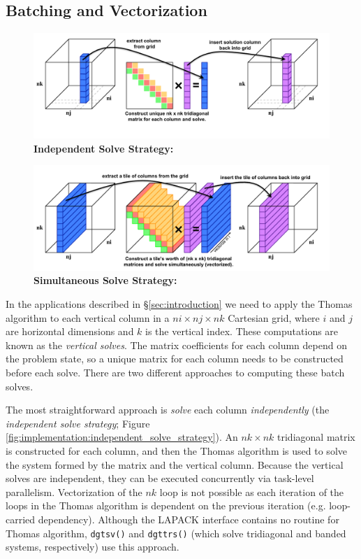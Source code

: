 \documentclass{sig-alternate-05-2015}
\begin{document}
\subsection{Batching and Vectorization}
\label{sec:implementation:batching_and_parallelism}

\begin{figure}[!bt]
  \centering
  \label{fig:independent_solve_strategy}
  \caption{
    \textbf{Independent Solve Strategy:} 
  }
  \includegraphics[width=0.95\columnwidth]{figures/tds_scalar.pdf}
\end{figure}

\begin{figure}[!bt]
  \centering
  \label{fig:simultaneous_solve_strategy}
  \caption{
    \textbf{Simultaneous Solve Strategy:} 
  }
  \includegraphics[width=0.95\columnwidth]{figures/tds_vector.pdf}
\end{figure}

In the applications described in \S\ref{sec:introduction} we need to apply the
  Thomas algorithm to each vertical column in a \(ni \times nj \times nk\)
  Cartesian grid, where \(i\) and \(j\) are horizontal dimensions and \(k\) is
  the vertical index.
These computations are known as the \emph{vertical solves}.
The matrix coefficients for each column depend on the problem state, so a
  unique matrix for each column needs to be constructed before each solve.
There are two different approaches to computing these batch solves.

The most straightforward approach is \emph{solve} each column
  \emph{independently} (the \emph{independent solve strategy}; Figure
  \ref{fig:implementation:independent_solve_strategy}).
An \(nk \times nk\) tridiagonal matrix is constructed for each column, and then
  the Thomas algorithm is used to solve the system formed by the matrix and the
  vertical column.
Because the vertical solves are independent, they can be executed concurrently
  via task-level parallelism.
Vectorization of the \(nk\) loop is not possible as each iteration of the loops
  in the Thomas algorithm is dependent on the previous iteration (e.g.
  loop-carried dependency).
Although the LAPACK interface contains no routine for Thomas algorithm,
  \lstinline{dgtsv()} and \lstinline{dgttrs()} (which solve tridiagonal and
  banded systems, respectively) use this approach.
\end{document}
